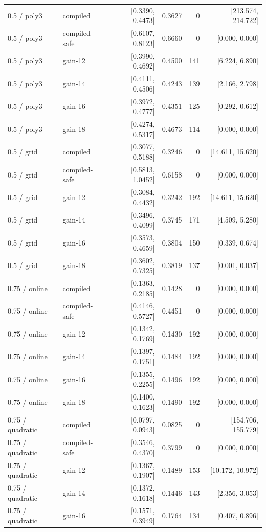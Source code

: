 \begin{longtable}{@{}llrrrr@{}}
0.5 / poly3 & compiled & [0.3390, 0.4473] & 0.3627 & 0 & [213.574, 214.722]\\
0.5 / poly3 & compiled-safe & [0.6107, 0.8123] & 0.6660 & 0 & [0.000, 0.000]\\
0.5 / poly3 & gain-12 & [0.3990, 0.4692] & 0.4500 & 141 & [6.224, 6.890]\\
0.5 / poly3 & gain-14 & [0.4111, 0.4506] & 0.4243 & 139 & [2.166, 2.798]\\
0.5 / poly3 & gain-16 & [0.3972, 0.4777] & 0.4351 & 125 & [0.292, 0.612]\\
0.5 / poly3 & gain-18 & [0.4274, 0.5317] & 0.4673 & 114 & [0.000, 0.000]\\
0.5 / grid & compiled & [0.3077, 0.5188] & 0.3246 & 0 & [14.611, 15.620]\\
0.5 / grid & compiled-safe & [0.5813, 1.0452] & 0.6158 & 0 & [0.000, 0.000]\\
0.5 / grid & gain-12 & [0.3084, 0.4432] & 0.3242 & 192 & [14.611, 15.620]\\
0.5 / grid & gain-14 & [0.3496, 0.4099] & 0.3745 & 171 & [4.509, 5.280]\\
0.5 / grid & gain-16 & [0.3573, 0.4659] & 0.3804 & 150 & [0.339, 0.674]\\
0.5 / grid & gain-18 & [0.3602, 0.7325] & 0.3819 & 137 & [0.001, 0.037]\\
0.75 / online & compiled & [0.1363, 0.2185] & 0.1428 & 0 & [0.000, 0.000]\\
0.75 / online & compiled-safe & [0.4146, 0.5727] & 0.4451 & 0 & [0.000, 0.000]\\
0.75 / online & gain-12 & [0.1342, 0.1769] & 0.1430 & 192 & [0.000, 0.000]\\
0.75 / online & gain-14 & [0.1397, 0.1751] & 0.1484 & 192 & [0.000, 0.000]\\
0.75 / online & gain-16 & [0.1355, 0.2255] & 0.1496 & 192 & [0.000, 0.000]\\
0.75 / online & gain-18 & [0.1400, 0.1623] & 0.1490 & 192 & [0.000, 0.000]\\
0.75 / quadratic & compiled & [0.0797, 0.0943] & 0.0825 & 0 & [154.706, 155.779]\\
0.75 / quadratic & compiled-safe & [0.3546, 0.4370] & 0.3799 & 0 & [0.000, 0.000]\\
0.75 / quadratic & gain-12 & [0.1367, 0.1907] & 0.1489 & 153 & [10.172, 10.972]\\
0.75 / quadratic & gain-14 & [0.1372, 0.1618] & 0.1446 & 143 & [2.356, 3.053]\\
0.75 / quadratic & gain-16 & [0.1571, 0.3949] & 0.1764 & 134 & [0.407, 0.896]\\

\end{longtable}
